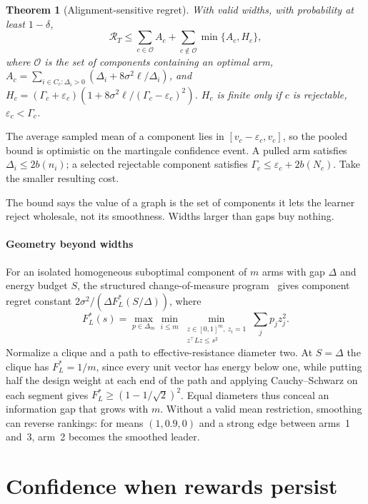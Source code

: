 \documentclass[conference]{IEEEtran}
\newtheorem{theorem}{Theorem}
\begin{document}
\begin{theorem}[Alignment-sensitive regret]\label{thm:a1}
With valid widths, with probability at least $1-\delta$,
\[
\mathcal R_T\le\textstyle\sum_{c\in\mathcal O}A_c+\sum_{c\notin\mathcal O}\min\{A_c,H_c\},
\]
where $\mathcal O$ is the set of components containing an optimal arm, $A_c=\sum_{i\in C_c:\Delta_i>0}(\Delta_i+8\sigma^2\ell/\Delta_i)$, and $H_c=(\Gamma_c+\varepsilon_c)(1+8\sigma^2\ell/(\Gamma_c-\varepsilon_c)^2)$. $H_c$ is finite only if $c$ is \emph{rejectable}, $\varepsilon_c<\Gamma_c$.
\end{theorem}

\begin{IEEEproof}[Sketch]
The average sampled mean of a component lies in $[v_c-\varepsilon_c,v_c]$, so the pooled bound is optimistic on the martingale confidence event. A pulled arm satisfies $\Delta_i\le2b(n_i)$; a selected rejectable component satisfies $\Gamma_c\le\varepsilon_c+2b(N_c)$. Take the smaller resulting cost.
\end{IEEEproof}

The bound says the value of a graph is the set of components it lets the learner reject wholesale, not its smoothness. Widths larger than gaps buy nothing.

\paragraph*{Geometry beyond widths} For an isolated homogeneous suboptimal component of $m$ arms with gap $\Delta$ and energy budget $S$, the structured change-of-measure program~\cite{combes2017minimal} gives component regret constant $2\sigma^2/(\Delta F_L^*(S/\Delta))$, where
\[
F_L^*(s)=\max_{p\in\Delta_m}\min_{i\le m}\min_{\substack{z\in[0,1]^m,\ z_i=1\\z^\top Lz\le s^2}}\textstyle\sum_jp_jz_j^2.
\]
Normalize a clique and a path to effective-resistance diameter two. At $S=\Delta$ the clique has $F_L^*=1/m$, since every unit vector has energy below one, while putting half the design weight at each end of the path and applying Cauchy--Schwarz on each segment gives $F_L^*\ge(1-1/\sqrt2)^2$. Equal diameters thus conceal an information gap that grows with $m$. Without a valid mean restriction, smoothing can reverse rankings: for means $(1,0.9,0)$ and a strong edge between arms~1 and~3, arm~2 becomes the smoothed leader.

\section{Confidence when rewards persist}\label{sec:info}
\end{document}
